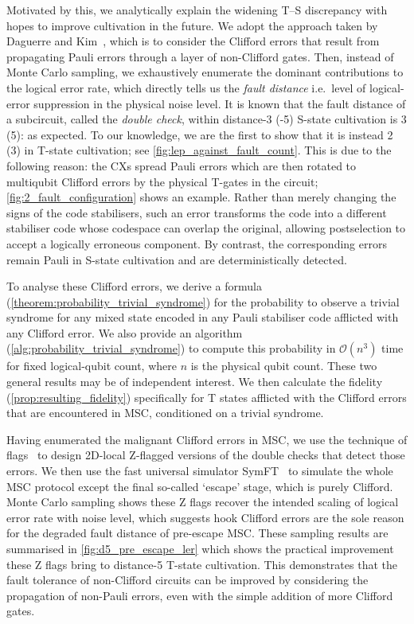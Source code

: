 Motivated by this,
we analytically explain the widening T--S discrepancy
with hopes to improve cultivation in the future.
We adopt the approach taken by Daguerre and Kim~\cite[\S V]{Daguerre2025},
which is to consider the Clifford errors that result from
propagating Pauli errors through a layer of non-Clifford gates.
Then,
instead of Monte Carlo sampling,
we exhaustively enumerate the dominant contributions
to the logical error rate,
which directly tells us the \emph{fault distance}
i.e.\ level of logical-error suppression in the physical noise level.
It is known that the fault distance of a subcircuit,
called the \emph{double check},
within distance-3 (-5) S-state cultivation is 3 (5): as expected.
To our knowledge,
we are the first to show that it is instead 2 (3) in T-state cultivation;
see \cref{fig:lep_against_fault_count}.
This is due to the following reason:
the CXs spread Pauli errors which are then rotated
to multiqubit Clifford errors by the physical T-gates in the circuit;
\cref{fig:2_fault_configuration} shows an example.
Rather than merely changing the signs of the code stabilisers,
such an error transforms the code into a different stabiliser code
whose codespace can overlap the original,
allowing postselection to accept a logically erroneous component.
By contrast,
the corresponding errors remain Pauli in S-state cultivation
and are deterministically detected.

To analyse these Clifford errors,
we derive a formula (\cref{theorem:probability_trivial_syndrome})
for the probability to observe a trivial syndrome
for any mixed state encoded in any Pauli stabiliser code afflicted with any Clifford error.
We also provide an algorithm (\cref{alg:probability_trivial_syndrome})
to compute this probability in $\mathcal O(n^3)$ time
for fixed logical-qubit count,
where $n$ is the physical qubit count.
These two general results may be of independent interest.
We then calculate the fidelity (\cref{prop:resulting_fidelity})
specifically for T states afflicted with
the Clifford errors that are encountered in MSC,
conditioned on a trivial syndrome.

Having enumerated the malignant Clifford errors in MSC,
we use the technique of flags~\cite{Chao2018}
to design 2D-local Z-flagged versions of the double checks that detect those errors.
We then use the fast universal simulator SymFT~\cite{Fang2026a}
to simulate the whole MSC protocol except
the final so-called `escape' stage, which is purely Clifford.
Monte Carlo sampling shows these Z flags recover
the intended scaling of logical error rate with noise level,
which suggests hook Clifford errors
are the sole reason for the degraded fault distance of pre-escape MSC.
These sampling results are summarised in \cref{fig:d5_pre_escape_ler}
which shows the practical improvement
these Z flags bring to distance-5 T-state cultivation.
This demonstrates that the fault tolerance of non-Clifford circuits
can be improved by considering the propagation of non-Pauli errors,
even with the simple addition of more Clifford gates.

